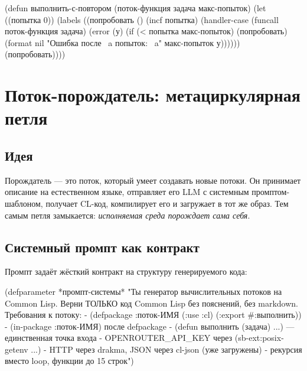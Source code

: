 \documentclass[11pt,a4paper]{article}
\begin{document}
\begin{lispcode}[caption={подмастерье/исполнитель.lisp — retry через рекурсию}]
(defun выполнить-с-повтором (поток-функция задача макс-попыток)
  (let ((попытка 0))
    (labels ((попробовать ()
               (incf попытка)
               (handler-case
                   (funcall поток-функция задача)
                 (error (у)
                   (if (< попытка макс-попыток)
                       (попробовать)
                       (format nil "Ошибка после ~a попыток: ~a"
                               макс-попыток у))))))
      (попробовать))))
\end{lispcode}

\section{Поток-порождатель: метациркулярная петля}
\label{sec:spawner}

\subsection{Идея}

Порождатель — это поток, который умеет создавать новые потоки. Он принимает описание на естественном языке, отправляет его LLM с системным промптом-шаблоном, получает CL-код, компилирует его и загружает в тот же образ. Тем самым петля замыкается: \textit{исполняемая среда порождает сама себя}.

\subsection{Системный промпт как контракт}

Промпт задаёт жёсткий контракт на структуру генерируемого кода:

\begin{lispcode}[caption={мастер/потоки/порождатель.lisp — системный промпт}]
(defparameter *промпт-системы*
  "Ты генератор вычислительных потоков на Common Lisp.
Верни ТОЛЬКО код Common Lisp без пояснений, без markdown.
Требования к потоку:
- (defpackage :поток-ИМЯ (:use :cl) (:export #:выполнить))
- (in-package :поток-ИМЯ) после defpackage
- (defun выполнить (задача) ...) — единственная точка входа
- OPENROUTER_API_KEY через (sb-ext:posix-getenv ...)
- HTTP через drakma, JSON через cl-json (уже загружены)
- рекурсия вместо loop, функции до 15 строк")
\end{lispcode}
\end{document}
